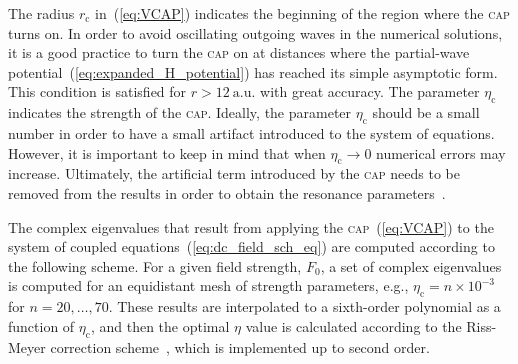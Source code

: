 The radius $r_{\mathrm{c}}$ in~(\ref{eq:VCAP}) indicates the beginning
of the region where the \textsc{cap} turns on. In order to avoid
oscillating outgoing waves in the numerical solutions, it is a good
practice to turn the \textsc{cap} on at distances where the
partial-wave potential~(\ref{eq:expanded_H_potential}) has reached its
simple asymptotic form. This condition is satisfied for $r >
12\ \mathrm{a.u.}$ with great accuracy. The parameter
$\eta_{\mathrm{c}}$ indicates the strength of the
\textsc{cap}. Ideally, the parameter $\eta_{\mathrm{c}}$ should be a
small number in order to have a small artifact introduced to the
system of equations. However, it is important to keep in mind that
when $\eta_{\mathrm{c}}\to 0$ numerical errors may
increase. Ultimately, the artificial term introduced by the
\textsc{cap} needs to be removed from the results in order to obtain
the resonance parameters~\cite{RissMeyer_1993}.

The complex eigenvalues that result from applying the
\textsc{cap}~(\ref{eq:VCAP}) to the system of coupled
equations~(\ref{eq:dc_field_sch_eq}) are computed according to the
following scheme. For a given field strength, $F_{0}$, a set of
complex eigenvalues is computed for an equidistant mesh of strength
parameters, e.g., $\eta_{\mathrm{c}} = n \times 10^{-3}$ for $n = 20,
\dots, 70$. These results are interpolated to a sixth-order polynomial
as a function of $\eta_{\mathrm{c}}$, and then the optimal $\eta$
value is calculated according to the Riss-Meyer correction
scheme~\cite{RissMeyer_1993}, which is implemented up to second order.

